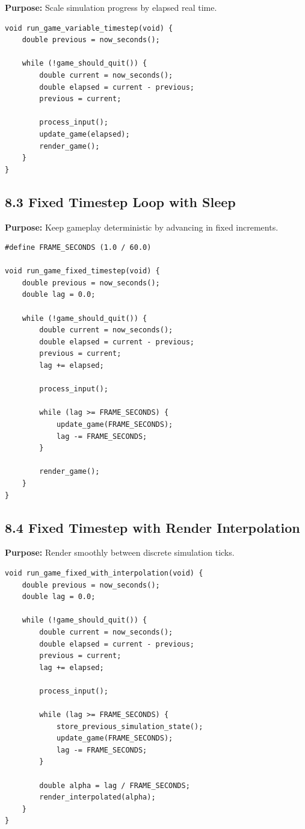 \documentclass[10pt,letterpaper]{article}
\begin{document}
\textbf{Purpose:} Scale simulation progress by elapsed real time.

\begin{verbatim}
void run_game_variable_timestep(void) {
    double previous = now_seconds();

    while (!game_should_quit()) {
        double current = now_seconds();
        double elapsed = current - previous;
        previous = current;

        process_input();
        update_game(elapsed);
        render_game();
    }
}
\end{verbatim}

\subsection{8.3 Fixed Timestep Loop with Sleep}

\textbf{Purpose:} Keep gameplay deterministic by advancing in fixed increments.

\begin{verbatim}
#define FRAME_SECONDS (1.0 / 60.0)

void run_game_fixed_timestep(void) {
    double previous = now_seconds();
    double lag = 0.0;

    while (!game_should_quit()) {
        double current = now_seconds();
        double elapsed = current - previous;
        previous = current;
        lag += elapsed;

        process_input();

        while (lag >= FRAME_SECONDS) {
            update_game(FRAME_SECONDS);
            lag -= FRAME_SECONDS;
        }

        render_game();
    }
}
\end{verbatim}

\subsection{8.4 Fixed Timestep with Render Interpolation}

\textbf{Purpose:} Render smoothly between discrete simulation ticks.

\begin{verbatim}
void run_game_fixed_with_interpolation(void) {
    double previous = now_seconds();
    double lag = 0.0;

    while (!game_should_quit()) {
        double current = now_seconds();
        double elapsed = current - previous;
        previous = current;
        lag += elapsed;

        process_input();

        while (lag >= FRAME_SECONDS) {
            store_previous_simulation_state();
            update_game(FRAME_SECONDS);
            lag -= FRAME_SECONDS;
        }

        double alpha = lag / FRAME_SECONDS;
        render_interpolated(alpha);
    }
}
\end{verbatim}
\end{document}
